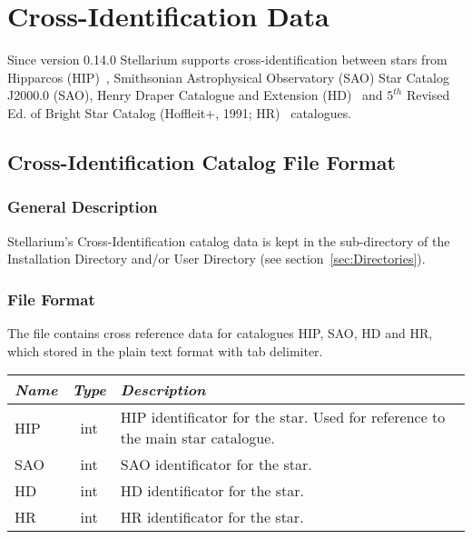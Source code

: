 \section{Cross-Identification Data}
\label{sec:StarCatalogues:CrossIdentificationData}

Since version 0.14.0 Stellarium supports cross-identification between stars from 
Hipparcos (HIP)~\cite{2012AstL...38..331A}, 
Smithsonian Astrophysical Observatory (SAO) Star Catalog J2000.0 (SAO), 
Henry Draper Catalogue and Extension (HD)~\cite{1993yCat.3135....0C} and 
$5^{th}$ Revised Ed. of Bright Star Catalog (Hoffleit+, 1991; HR)~\cite{1964cbs..book.....H} catalogues.

\subsection{Cross-Identification Catalog File Format}
\label{sec:StarCatalogues:CrossIdentificationData:format}

\subsubsection{General Description}
\label{sec:StarCatalogues:CrossIdentificationData:general}

Stellarium's Cross-Identification catalog data is kept
in the  sub-directory of the Installation Directory and/or User Directory (see section~\ref{sec:Directories}).

\subsubsection{File Format}
\label{sec:StarCatalogues:CrossIdentificationData:file}

The file  contains cross reference data for catalogues HIP, SAO, HD and HR, which stored in the plain text format with tab delimiter.

\begin{table}[htb]
\begin{tabularx}{\textwidth}{l|c|X}\toprule
\emph{Name} & \emph{Type} & \emph{Description}\\\midrule
HIP	& int & HIP identificator for the star. Used for reference to the main star catalogue.\\%
SAO	& int & SAO identificator for the star.\\%
HD	& int & HD identificator for the star.\\%
HR	& int & HR identificator for the star.\\\bottomrule
\end{tabularx}
\end{table}

